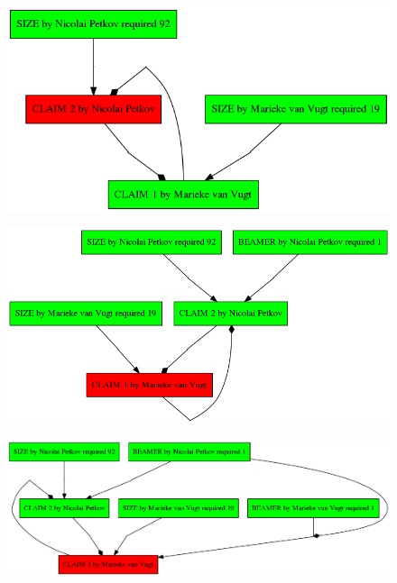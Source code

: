 \documentclass{beamer}
\begin{document}
\begin{frame}[plain]
	\begin{figure}
		\includegraphics[keepaspectratio,width=\textwidth,height=\textheight,]{demo/0}
	\end{figure}
\end{frame}

\begin{frame}[plain]
	\begin{figure}
		\includegraphics[keepaspectratio,width=\textwidth,height=\textheight,]{demo/1}
	\end{figure}
\end{frame}

\begin{frame}[plain]
	\begin{figure}
		\includegraphics[keepaspectratio,width=\textwidth,height=\textheight,]{demo/2}
	\end{figure}
\end{frame}
\end{document}
